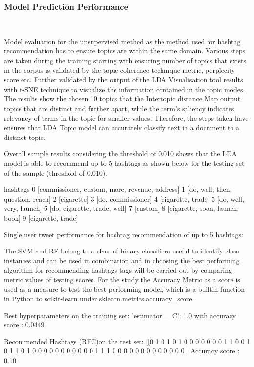\subsubsection{Model Prediction Performance}\\


Model evaluation for the unsupervised method as the method used for hashtag recommendation has to ensure topics are within the same domain.  Various steps are taken during the training starting with ensuring number of topics that exists in the corpus is validated by the topic coherence technique metric, perplecity score etc.  Further validated by the output of the LDA Visualisation tool results with t-SNE technique to visualize the information contained in the topic modes.  The results show the chosen 10 topics that the Intertopic distance Map output topics that are distinct and further apart, while the term's saliency indicates relevancy of terms in the topic for smaller values.  Therefore, the steps taken have ensures that LDA Topic model can accurately classify text in a document to a distinct topic.  

Overall sample results considering the threshold of 0.010 shows that the LDA model is able to recommend up to 5 hashtags as shown below for the testing set of the sample (threshold of 0.010).

    hashtags
0	[commissioner, custom, more, revenue, address]
1	[do, well, then, question, reach]
2	[cigarette]
3	[do, commissioner]
4	[cigarette, trade]
5	[do, well, very, launch]
6	[do, cigarette, trade, well]
7	[custom]
8	[cigarette, soon, launch, book]
9	[cigarette, trade]

Single user tweet performance for hashtag recommendation of up to 5 hashtags:

The SVM and RF belong to a class of binary classifiers useful to identify class instances and can be used in combination and in choosing the best performing algorithm for recommending hashtags tags will be carried out by comparing metric values of testing scores.  For the study the Accuracy Metric as a score is used as a measure to test the best performing model, which is a builtin function in Python to scikit-learn under sklearn.metrics.accuracy_score.

Best hyperparameters on the training set: {'estimator__C': 1.0} with
accuracy score : 0.0449

Recommended Hashtags (RFC)on the test set: [[0 1 0 1 0 1 0 0 0 0 0 0 0 1 1 0 0 1 0 1 1 0 1 0 0 0 0 0 0 0 0 0 0 0 1 1 1 0 0 0 0 0 0 0 0 0 0 0 0 0]]
Accuracy score : 0.10

